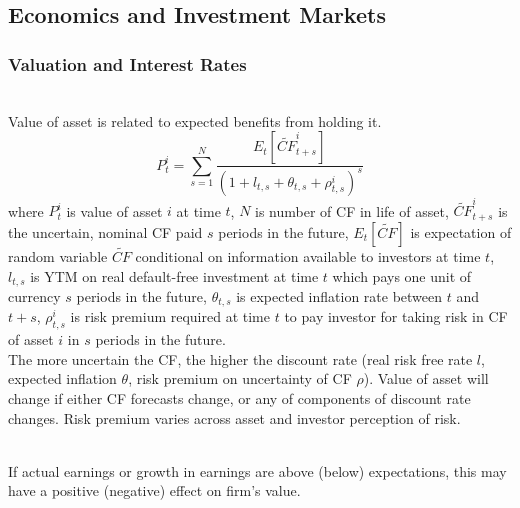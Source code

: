 \subsection{Economics and Investment Markets}

\subsubsection{Valuation and Interest Rates}

\begin{remark} \\
Value of asset is related to expected benefits from holding it.
\begin{equation}
P_t^i = \sum\limits_{s=1}^N \frac{E_t [\widetilde{CF}^i_{t+s}]}{(1+l_{t,s}+\theta_{t,s}+\rho_{t,s}^i)^s} \nonumber
\end{equation}
where $P_t^i$ is value of asset $i$ at time $t$, $N$ is number of CF in life of asset, $\widetilde{CF}^i_{t+s}$ is the uncertain, nominal CF paid $s$ periods in the future, $E_t [\widetilde{CF}]$ is expectation of random variable $\widetilde{CF}$ conditional on information available to investors at time $t$, $l_{t,s}$ is YTM on real default-free investment at time $t$ which pays one unit of currency $s$ periods in the future, $\theta_{t,s}$ is expected inflation rate between $t$ and $t+s$,  $\rho_{t,s}^i$ is risk premium required at time $t$ to pay investor for taking risk in CF of asset $i$ in $s$ periods in the future.\\
The more uncertain the CF, the higher the discount rate (real risk free rate $l$, expected inflation $\theta$, risk premium on uncertainty of CF $\rho$). Value of asset will change if either CF forecasts change, or any of components of discount rate changes. Risk premium varies across asset and investor perception of risk.
\end{remark}

\begin{remark} \\
If actual earnings or growth in earnings are above (below) expectations, this may have a positive (negative) effect on firm's value.
\end{remark}

